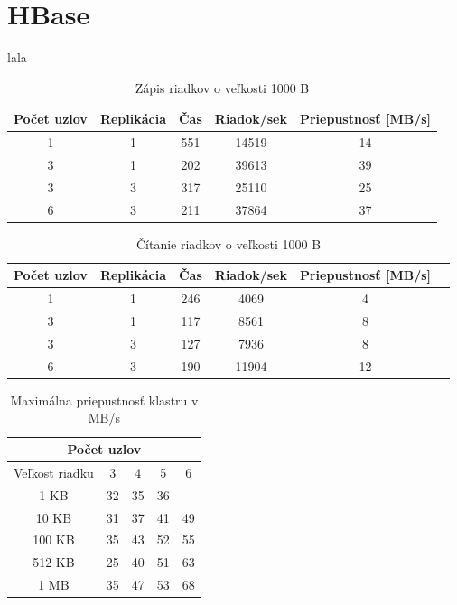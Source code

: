 \documentclass[11pt,twoside,a4paper]{book}
\begin{document}
\section{HBase}

lala 

\begin{table}[hp]
\begin{center}
\begin{tabular}{|c|c|c|c|c|}
\hline Počet uzlov & Replikácia  & Čas & Riadok/sek & Priepustnosť [MB/s]\\ 
\hline
\hline 1 & 1 &  551 & 14519 & 14\\ 
\hline 3 & 1 &  202 & 39613 & 39\\ 
\hline 3 & 3 &  317 & 25110 & 25\\ 
\hline 6 & 3 &  211 & 37864 & 37\\ 
\hline
\end{tabular} 
\end{center}
\caption{Zápis riadkov o veľkosti 1000 B}
\label{tab:HPerf2}
\end{table}



\begin{table}[hp]
\begin{center}
\begin{tabular}{|c|c|c|c|c|c|}

\hline Počet uzlov & Replikácia & Čas & Riadok/sek & Priepustnosť [MB/s]\\ 
\hline
\hline 1 & 1 & 246 & 4069 & 4\\ 
\hline 3 & 1 & 117 & 8561 & 8\\ 
\hline 3 & 3 & 127 & 7936 & 8\\ 
\hline 6 & 3 & 190 & 11904 & 12\\ 
\hline
\end{tabular} 
\end{center}
\caption{Čítanie riadkov o veľkosti 1000 B}
\label{tab:CPerf3}
\end{table}




\begin{table}[htp]
\begin{center}
\begin{tabular}{|c|c|c|c|c|}
\hline
\multicolumn{5}{|c|}{Počet uzlov}  \\
\hline Veľkost riadku & 3 & 4 & 5 & 6\\ 
\hline
\hline 1 KB & 32 & 35 & 36 & \\ 
\hline 10 KB & 31 & 37 & 41 & 49 \\ 
\hline 100 KB & 35 & 43 & 52 & 55\\ 
\hline 512 KB & 25 & 40 & 51 & 63 \\  
\hline 1 MB & 35 & 47 & 53 & 68 \\ 
\hline
\end{tabular} 
\end{center}
\caption{Maximálna priepustnosť klastru v MB/s}
\label{tab:CPerf1}
\end{table}
\end{document}
